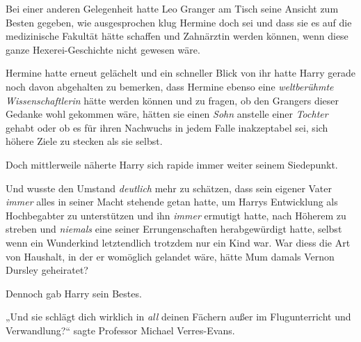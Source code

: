Bei einer anderen Gelegenheit hatte Leo Granger am Tisch seine Ansicht zum Besten gegeben, wie ausgesprochen klug Hermine doch sei und dass sie es auf die medizinische Fakultät hätte schaffen und Zahnärztin werden können, wenn diese ganze Hexerei-Geschichte nicht gewesen wäre.

Hermine hatte erneut gelächelt und ein schneller Blick von ihr hatte Harry gerade noch davon abgehalten zu bemerken, dass Hermine ebenso eine \emph{weltberühmte Wissenschaftlerin} hätte werden können und zu fragen, ob den Grangers dieser Gedanke wohl gekommen wäre, hätten sie einen \emph{Sohn} anstelle einer \emph{Tochter} gehabt oder ob es für ihren Nachwuchs in jedem Falle inakzeptabel sei, sich höhere Ziele zu stecken als sie selbst.

Doch mittlerweile näherte Harry sich rapide immer weiter seinem Siedepunkt.

Und wusste den Umstand \emph{deutlich} mehr zu schätzen, dass sein eigener Vater \emph{immer} alles in seiner Macht stehende getan hatte, um Harrys Entwicklung als Hochbegabter zu unterstützen und ihn \emph{immer} ermutigt hatte, nach Höherem zu streben und \emph{niemals} eine seiner Errungenschaften herabgewürdigt hatte, selbst wenn ein Wunderkind letztendlich trotzdem nur ein Kind war. War diess die Art von Haushalt, in der er womöglich gelandet wäre, hätte Mum damals Vernon Dursley geheiratet?

Dennoch gab Harry sein Bestes.

„Und sie schlägt dich wirklich in \emph{all} deinen Fächern außer im Flugunterricht und Verwandlung?“ sagte Professor Michael Verres-Evans.

